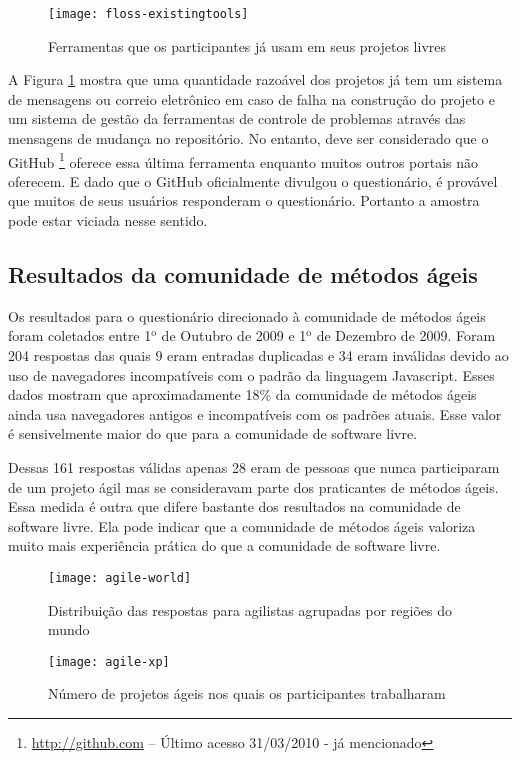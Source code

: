 \begin{figure}
  \centering
  \texttt{[image: floss-existingtools]}
  \caption{Ferramentas que os participantes já usam em seus projetos
    livres}
  \label{fig:floss-existingtools}
\end{figure}

A Figura \ref{fig:floss-existingtools} mostra que uma quantidade
razoável dos projetos já tem um sistema de mensagens ou correio
eletrônico em caso de falha na construção do projeto e um sistema de
gestão da ferramentas de controle de problemas através das mensagens
de mudança no repositório. No entanto, deve ser considerado que o
GitHub \footnote{\url{http://github.com} -- Último acesso 31/03/2010 - já
  mencionado} oferece essa última ferramenta enquanto muitos outros
portais não oferecem. E dado que o GitHub oficialmente divulgou o
questionário, é provável que muitos de seus usuários responderam o
questionário. Portanto a amostra pode estar viciada nesse sentido.

\subsection{Resultados da comunidade de métodos ágeis}
\label{sec:resp-agile}

Os resultados para o questionário direcionado à comunidade de métodos
ágeis foram coletados entre 1$^{\textrm{o}}$ de Outubro de 2009 e
1$^{\textrm{o}}$ de Dezembro de 2009. Foram 204 respostas das quais 9
eram entradas duplicadas e 34 eram inválidas devido ao uso de
navegadores incompatíveis com o padrão da linguagem Javascript. Esses
dados mostram que aproximadamente 18\% da comunidade de métodos ágeis
ainda usa navegadores antigos e incompatíveis com os padrões
atuais. Esse valor é sensivelmente maior do que para a comunidade de
software livre.

Dessas 161 respostas válidas apenas 28 eram de pessoas que nunca
participaram de um projeto ágil mas se consideravam parte dos
praticantes de métodos ágeis. Essa medida é outra que difere bastante
dos resultados na comunidade de software livre. Ela pode indicar que a
comunidade de métodos ágeis valoriza muito mais experiência prática do
que a comunidade de software livre.

\begin{figure}[htb]
  \begin{minipage}[t]{0.45\linewidth}
    \centering
    \texttt{[image: agile-world]}
    \caption{Distribuição das respostas para agilistas agrupadas por
      regiões do mundo}
    \label{fig:agile-world}
  \end{minipage}
  \begin{minipage}[t]{0.55\linewidth}
    \centering
    \texttt{[image: agile-xp]}
    \caption{Número de projetos ágeis nos quais os participantes
      trabalharam}
    \label{fig:agile-xp}
  \end{minipage}
\end{figure}

